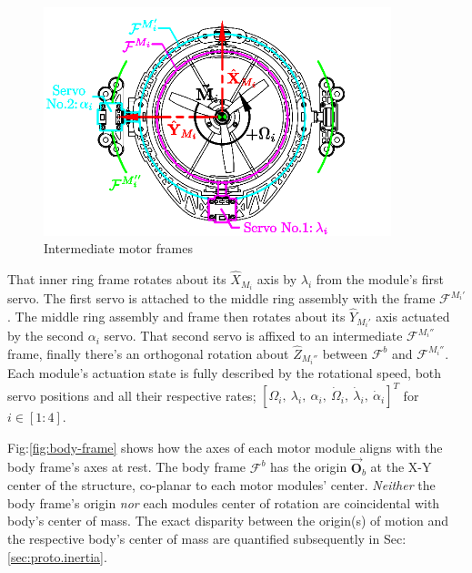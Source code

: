\begin{figure}[hbtp]
\vspace{-10pt}
\centering
\includegraphics[width=0.9\textwidth]{figs/motor-frame}
\caption{Intermediate motor frames}
\label{fig:motor-frame}
\vspace{-8pt}
\end{figure}
\par
That inner ring frame rotates about its $\hat{X}_{M_i}$ axis by $\lambda_i$ from the module's first servo. The first servo is attached to the middle ring assembly with the frame $\mathcal{F}^{M_i'}$. The middle ring assembly and frame then rotates about its $\hat{Y}_{M_i'}$ axis actuated by the second $\alpha_i$ servo. That second servo is affixed to an intermediate $\mathcal{F}^{M_i''}$ frame, finally there's an orthogonal rotation about $\hat{Z}_{M_i''}$ between $\mathcal{F}^b$ and $\mathcal{F}^{M_i''}$. Each module's actuation state is fully described by the rotational speed, both servo positions and all their respective rates; $[\Omega_{i},~\lambda_{i},~\alpha_{i},~\dot{\Omega}_i,~\dot{\lambda}_i,~\dot{\alpha}_i]^{T}$ for $i\in [1:4]$. 
\par
Fig:\ref{fig:body-frame} shows how the axes of each motor module aligns with the body frame's axes at rest. The body frame $\mathcal{F}^b$ has the origin $\vec{\mathbf{O}}_b$ at the X-Y center of the structure, co-planar to each motor modules' center. \emph{Neither} the body frame's origin \emph{nor} each modules center of rotation are coincidental with body's center of mass. The exact disparity between the origin(s) of motion and the respective body's center of mass are quantified subsequently in Sec:\ref{sec:proto.inertia}. 
